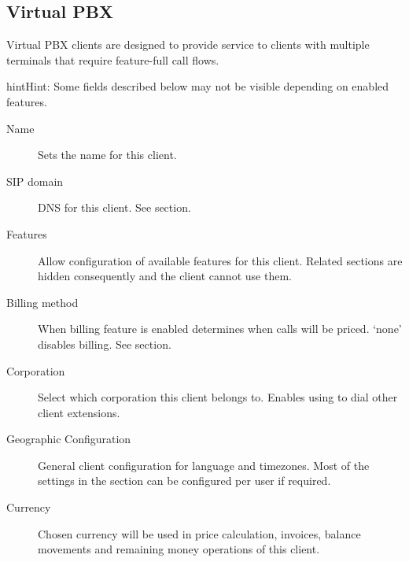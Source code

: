 \documentclass[letterpaper,10pt,english]{sphinxmanual}
\begin{document}
\subsection{Virtual PBX}
\label{administration_portal/brand/clients/virtual_pbx:id1}\label{administration_portal/brand/clients/virtual_pbx::doc}\label{administration_portal/brand/clients/virtual_pbx:virtual-pbx}
Virtual PBX clients are designed to provide service to clients with multiple terminals
that require feature-full call flows.

\begin{notice}{hint}{Hint:}
Some fields described below may not be visible depending on enabled features.
\begin{description}
\item[{Name}] \leavevmode
Sets the name for this client.

\item[{SIP domain}] \leavevmode
DNS for this client. See {\hyperref[getting_started/internal_calls/brand_portal:client\string-sip\string-domain]{}} section.

\item[{Features}] \leavevmode
Allow configuration of available features for this client.
Related sections are hidden consequently and the client cannot use them.

\item[{Billing method}] \leavevmode
When billing feature is enabled determines when calls will be priced. `none' disables billing.
See {\hyperref[administration_portal/brand/billing/index:billing]{}} section.

\item[{Corporation}] \leavevmode
Select which corporation this client belongs to. Enables using {\hyperref[administration_portal/client/vpbx/routing_endpoints/friends/internal_friends:internal\string-friends]{}} to
dial other client extensions.

\item[{Geographic Configuration}] \leavevmode
General client configuration for language and timezones. Most of the settings in the section can be
configured per user if required.

\item[{Currency}] \leavevmode
Chosen currency will be used in price calculation, invoices, balance movements and
remaining money operations of this client.


\end{description}
\end{notice}
\end{document}
